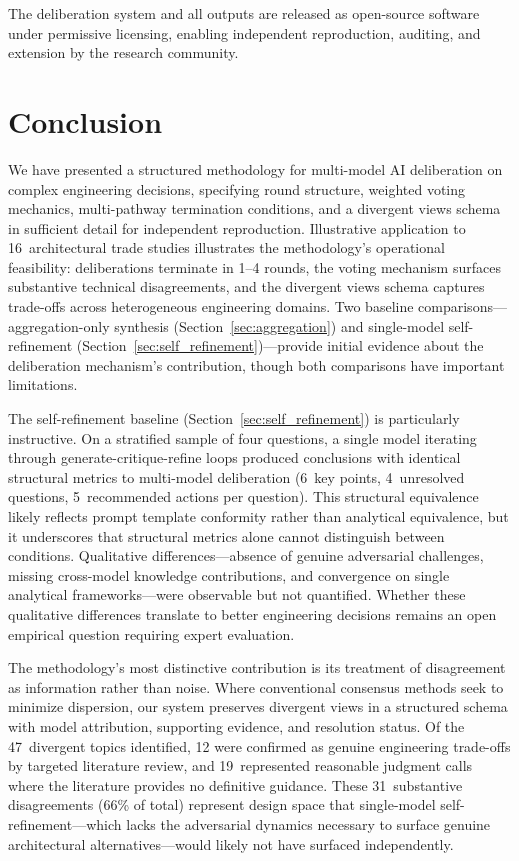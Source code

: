 \documentclass[11pt,a4paper]{article}
\begin{document}
The deliberation system and all outputs are released as open-source software under permissive licensing, enabling independent reproduction, auditing, and extension by the research community.

\section{Conclusion}
\label{sec:conclusion}

We have presented a structured methodology for multi-model AI deliberation on complex engineering decisions, specifying round structure, weighted voting mechanics, multi-pathway termination conditions, and a divergent views schema in sufficient detail for independent reproduction. Illustrative application to 16~architectural trade studies illustrates the methodology's operational feasibility: deliberations terminate in 1--4 rounds, the voting mechanism surfaces substantive technical disagreements, and the divergent views schema captures trade-offs across heterogeneous engineering domains. Two baseline comparisons---aggregation-only synthesis (Section~\ref{sec:aggregation}) and single-model self-refinement (Section~\ref{sec:self_refinement})---provide initial evidence about the deliberation mechanism's contribution, though both comparisons have important limitations.

The self-refinement baseline (Section~\ref{sec:self_refinement}) is particularly instructive. On a stratified sample of four questions, a single model iterating through generate-critique-refine loops produced conclusions with identical structural metrics to multi-model deliberation (6~key points, 4~unresolved questions, 5~recommended actions per question). This structural equivalence likely reflects prompt template conformity rather than analytical equivalence, but it underscores that structural metrics alone cannot distinguish between conditions. Qualitative differences---absence of genuine adversarial challenges, missing cross-model knowledge contributions, and convergence on single analytical frameworks---were observable but not quantified. Whether these qualitative differences translate to better engineering decisions remains an open empirical question requiring expert evaluation.

The methodology's most distinctive contribution is its treatment of disagreement as information rather than noise. Where conventional consensus methods seek to minimize dispersion, our system preserves divergent views in a structured schema with model attribution, supporting evidence, and resolution status. Of the 47~divergent topics identified, 12 were confirmed as genuine engineering trade-offs by targeted literature review, and 19~represented reasonable judgment calls where the literature provides no definitive guidance. These 31~substantive disagreements (66\% of total) represent design space that single-model self-refinement---which lacks the adversarial dynamics necessary to surface genuine architectural alternatives---would likely not have surfaced independently.
\end{document}
